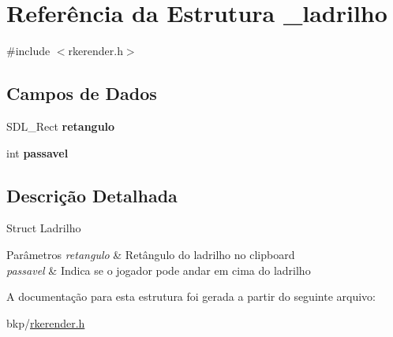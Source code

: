 \hypertarget{struct__ladrilho}{
\section{Referência da Estrutura \_\-ladrilho}
\label{struct__ladrilho}
}


{\ttfamily \#include $<$rkerender.h$>$}

\subsection*{Campos de Dados}
\begin{DoxyCompactItemize}
\item 
\hypertarget{struct__ladrilho_a66706353d918fc22d4b7130ef5a9fbc4}{
SDL\_\-Rect {\bfseries retangulo}}
\label{struct__ladrilho_a66706353d918fc22d4b7130ef5a9fbc4}

\item 
\hypertarget{struct__ladrilho_af4541a0087b5e63cdca818a994d5119c}{
int {\bfseries passavel}}
\label{struct__ladrilho_af4541a0087b5e63cdca818a994d5119c}

\end{DoxyCompactItemize}


\subsection{Descrição Detalhada}
Struct Ladrilho 
\begin{DoxyParams}{Parâmetros}
{\em retangulo} & Retângulo do ladrilho no clipboard \\
\hline
{\em passavel} & Indica se o jogador pode andar em cima do ladrilho \\
\hline
\end{DoxyParams}


A documentação para esta estrutura foi gerada a partir do seguinte arquivo:\begin{DoxyCompactItemize}
\item 
bkp/\hyperlink{rkerender_8h}{rkerender.h}\end{DoxyCompactItemize}
